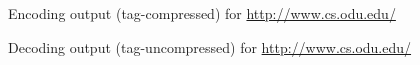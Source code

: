 \documentclass[letterpaper,11pt]{article}
\begin{document}
\begin{figure}[H]
	\centering
	\caption{Encoding output (tag-compressed) for \url{http://www.cs.odu.edu/}}
	\label{fig:csodu_encode_jpg}
\end{figure}

\begin{figure}[H]
	\centering
	\caption{Decoding output (tag-uncompressed) for \url{http://www.cs.odu.edu/}}
	\label{fig:csodu_decode_jpg}
\end{figure}
\end{document}
